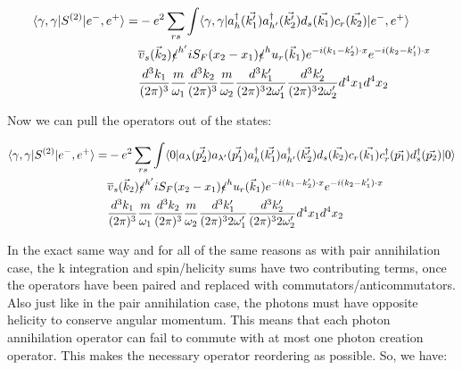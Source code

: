 \documentclass[a4]{article}
\begin{document}
\begin{framed}
            \begin{equation}
                \begin{aligned}
                    \langle \gamma, \gamma | S^{(2)} | e^{-}, e^{+} \rangle = & - e^{2} \sum_{r s} \int \langle \gamma, \gamma |a^{\dagger}_{h} (\vec{k'_1}) a^{\dagger}_{h'} (\vec{k'_2}) d_{s} (\vec{k_1}) c_{r} (\vec{k_2})| e^{-}, e^{+} \rangle \\
                    & \overline{v}_{s} (\vec{k}_2) \slashed{\epsilon}^{h'} i S_{F} (x_2 - x_1) \slashed{\epsilon}^{h} u_{r} (\vec{k}_1) e^{- i (k_1 - k'_2) \cdot x} e^{- i (k_2 - k'_1) \cdot x} \\
                    & \frac{d^3 k_1}{(2 \pi)^{3}} \frac{m}{\omega_1} \frac{d^3 k_2}{(2 \pi)^{3}} \frac{m}{\omega_2} \frac{d^3 k'_1}{(2 \pi)^{3} 2 \omega'_1} \frac{d^3 k'_2}{(2 \pi)^{3} 2 \omega'_2} d^4 x_1 d^4 x_2
                \end{aligned}
            \end{equation}

            Now we can pull the operators out of the states:

            \begin{equation}
                \begin{aligned}
                    \langle \gamma, \gamma | S^{(2)} | e^{-}, e^{+} \rangle = & - e^{2} \sum_{r s} \int \langle 0 |a_{\lambda} (\vec{p'_2}) a_{\lambda'} (\vec{p'_1}) a^{\dagger}_{h} (\vec{k'_1}) a^{\dagger}_{h'} (\vec{k'_2}) d_{s} (\vec{k_2}) c_{r} (\vec{k_1}) c^{\dagger}_{r} (\vec{p_1}) d^{\dagger}_{s} (\vec{p_2})| 0 \rangle \\
                    & \overline{v}_{s} (\vec{k}_2) \slashed{\epsilon}^{h'} i S_{F} (x_2 - x_1) \slashed{\epsilon}^{h} u_{r} (\vec{k}_1) e^{- i (k_1 - k'_2) \cdot x} e^{- i (k_2 - k'_1) \cdot x} \\
                    & \frac{d^3 k_1}{(2 \pi)^{3}} \frac{m}{\omega_1} \frac{d^3 k_2}{(2 \pi)^{3}} \frac{m}{\omega_2} \frac{d^3 k'_1}{(2 \pi)^{3} 2 \omega'_1} \frac{d^3 k'_2}{(2 \pi)^{3} 2 \omega'_2} d^4 x_1 d^4 x_2
                \end{aligned}
            \end{equation}

            In the exact same way and for all of the same reasons as with pair annihilation case, the k integration and spin/helicity sums have two
            contributing terms, once the operators have been paired and replaced with commutators/anticommutators. Also just like in the pair
            annihilation case, the photons must have opposite helicity to conserve angular momentum. This means that each photon annihilation operator
            can fail to commute with at most one photon creation operator. This makes the necessary operator reordering as possible. So, we have:


\end{framed}
\end{document}
